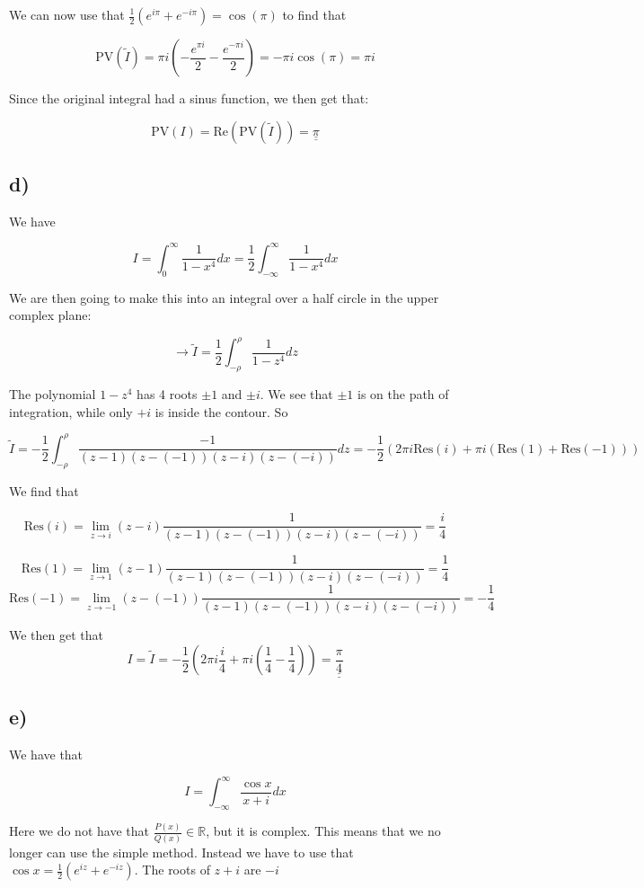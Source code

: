 \documentclass[a4paper,norsk, 10pt]{article}
\begin{document}
We can now use that $\frac{1}{2}(e^{i\pi} + e^{-i \pi}) = \cos(\pi)$ to find that



$$
\mathrm{PV}(\tilde{I}) = \pi i (-\frac{e^{\pi i}}{2} -\frac{e^{-\pi i}}{2}) = -\pi i \cos(\pi) = \pi i
$$

Since the original integral had a sinus function, we then get that:

$$
\mathrm{PV}({I}) = \mathrm{Re}(\mathrm{PV}(\tilde{I})) = \underline{\underline{\pi}}
$$

\subsection*{d)}
We have 

$$
I = \int_{0}^{\infty} \frac{1}{1-x^4}dx = \frac{1}{2}\int_{-\infty}^{\infty} \frac{1}{1-x^4}dx
$$

We are then going to make this into an integral over a half circle in the upper complex plane:

$$
\rightarrow \tilde{I} = \frac{1}{2}\int_{-\rho}^{\rho} \frac{1}{1-z^4} dz
$$

The polynomial $1-z^4$ has 4 roots $\pm 1$ and $\pm i$. We see that  $\pm 1$ is on the path of integration, while only $+i$ is inside the contour. So

$$
\tilde{I} = -\frac{1}{2}\int_{-\rho}^{\rho} \frac{-1}{(z-1)(z-(-1))(z-i)(z-(-i))} dz = -\frac{1}{2}(2\pi i \mathrm{Res}(i) + \pi i(\mathrm{Res}(1) +\mathrm{Res}(-1))) 
$$

We find that

$$
\mathrm{Res}(i) = \lim_{z\rightarrow i}(z-i)\frac{1}{(z-1)(z-(-1))(z-i)(z-(-i))} = \frac{i}{4}
$$

$$
\mathrm{Res}(1) = \lim_{z\rightarrow 1}(z-1)\frac{1}{(z-1)(z-(-1))(z-i)(z-(-i))} = \frac{1}{4}
$$
$$
\mathrm{Res}(-1) = \lim_{z\rightarrow -1}(z-(-1))\frac{1}{(z-1)(z-(-1))(z-i)(z-(-i))} = -\frac{1}{4}
$$

We then get that
$$
I = \tilde{I} = -\frac{1}{2}(2\pi i\frac{i}{4} + \pi i(\frac{1}{4} -\frac{1}{4})) = \underline{\underline{\frac{\pi}{4}}}
$$

\subsection*{e)}
We have that

$$
I = \int_{-\infty}^{\infty} \frac{\cos x}{x+i} dx
$$

Here we do not have that $\frac{P(x)}{Q(x)} \in \mathbb{R}$, but it is complex. This means that we no longer can use the simple method. Instead we have to use that $\cos x = \frac{1}{2}(e^{iz} + e^{-iz})$. The roots of $z + i$ are $-i$
\end{document}

